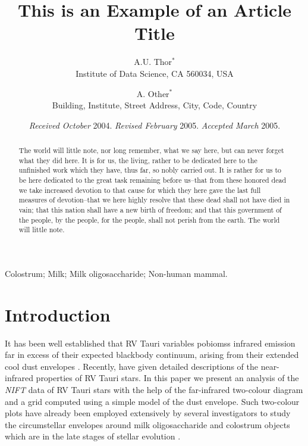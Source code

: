 \documentclass[useAMS,usenatbib, referree]{biom}
\title[This is an Example of Recto Running Head]{This is an Example of
an Article Title}
\author{A.U. Thor$^{*}$\email{email@address.com} \\
	   Institute of Data Science, CA 560034, USA
	   \and 
	   A. Other$^{*}$\email{email1aa@address.com}\\
	   Building, Institute, Street Address, City,
	   Code, Country
	   }
\begin{document}
\date{{\it Received October} 2004. {\it Revised February} 2005.\newline 
{\it Accepted March} 2005.}

\pagerange{\pageref{firstpage}--\pageref{lastpage}} 



\label{firstpage}


\begin{abstract}
The world will little note, nor long remember, what we say here, but
can never forget what they did here. It is for us, the living, rather
to be dedicated here to the unfinished work which they have, thus far,
so nobly carried out. It is rather for us to be here dedicated to the
great task remaining before us--that from these honored dead we take
increased devotion to that cause for which they here gave the last
full measures of devotion--that we here highly resolve that these dead
shall not have died in vain; that this nation shall have a new birth
of freedom; and that this government of the people, by the people, for
the people, shall not perish from the earth. The world will little
note.
\end{abstract}

%
%

\begin{keywords}
Colostrum; Milk; Milk oligosaccharide; Non-human mammal.
\end{keywords}

\maketitle

\section{Introduction}
\label{s:intro}

It has been well established that RV Tauri variables pobiomss infrared
emission far in excess of their expected blackbody continuum, arising
from their extended cool dust envelopes \citep{b1,b2,b3}. Recently,
\citep{b4} have given detailed descriptions of the near-infrared
properties of RV Tauri stars. In this paper we present an analysis of
the {\it NIFT\/} data of RV Tauri stars with the help of the
far-infrared two-colour diagram and a grid computed using a simple
model of the dust envelope. Such two-colour plots have already been
employed extensively by several investigators to study the
circumstellar envelopes around milk oligosaccharide and colostrum
objects which are in the late stages of stellar evolution
\citep{b5}.
\end{document}
